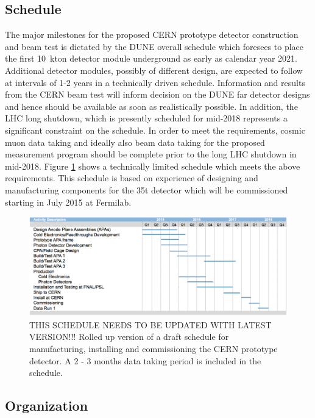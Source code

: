 \label{organ}

\subsection{Schedule}
The major milestones for the proposed CERN prototype detector construction and beam test is dictated by the DUNE overall schedule which foresees to place the first 10~kton detector module underground as early as calendar year 2021. Additional detector modules, possibly of different design, are expected to follow at intervals of 1-2 years in a technically driven schedule.
Information and results from the CERN beam test will inform decision on the DUNE far detector designs and hence should be available 
as soon as realistically possible. In addition, the LHC long shutdown, which is presently scheduled for mid-2018 represents a significant
constraint on the schedule.
In order to meet the requirements, cosmic muon data taking and ideally also beam data taking for the proposed measurement program 
should be complete prior to  the long LHC shutdown in mid-2018. 
Figure \ref{fig:schedule} shows a technically limited schedule which meets the above requirements.
This schedule is based on experience of designing and manufacturing components for the 35t detector which will be commissioned starting in July 2015 at  Fermilab.
\begin{figure}[h]
  \centering
\includegraphics[scale=0.34]{figures/150219_schedule_3APAmod.png}
  \caption{THIS SCHEDULE NEEDS TO BE UPDATED WITH LATEST VERSION!!! Rolled up version of a draft schedule for manufacturing, installing and commissioning the CERN prototype detector. A 2 - 3 months data taking period is included in the schedule. }
  \label{fig:schedule}
\end{figure}


\subsection{Organization}

